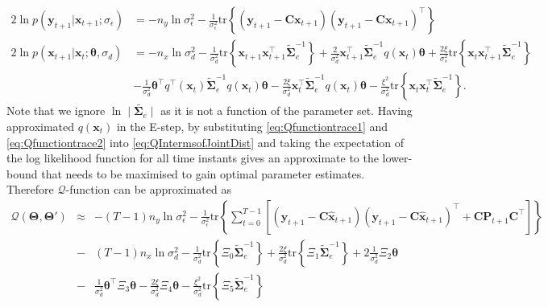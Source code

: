 \documentclass[]{article}
\begin{document}
\begin{align}\label{eq:Qfunctiontrace1}
  2\ln p\left(\mathbf y_{t+1}|\mathbf x_{t+1};\sigma_{\epsilon}\right) &= -n_y\ln \sigma_{\epsilon}^2-\frac{1}{\sigma_{\epsilon}^2}\mathrm{tr}\left\lbrace(\mathbf y_{t+1}-\mathbf C\mathbf  x_{t+1}) (\mathbf y_{t+1}-\mathbf C\mathbf  x_{t+1})^\top\right\rbrace    \\
 2 \ln p(\mathbf x_{t+1}|\mathbf x_{t};\boldsymbol \theta ,\sigma_d) &=-n_x\ln\sigma_d^2-\frac{1}{\sigma_d^2}\mathrm{tr}\left\lbrace\mathbf x_{t+1} \mathbf x_{t+1}^\top\tilde{\boldsymbol\Sigma}_e^{-1}\right\rbrace+\frac{2}{\sigma_d^2}\mathbf x_{t+1}^\top\tilde{\boldsymbol\Sigma}_e^{-1}q( \mathbf x_t)\boldsymbol\theta+\frac{2\xi}{\sigma_s^2} \mathrm{tr} \left\lbrace \mathbf x_t\mathbf x_{t+1}^\top\tilde{\boldsymbol\Sigma}_e^{-1}\right\rbrace \nonumber \\
&-\frac{1}{\sigma_d^2}\boldsymbol\theta^\top q^\top(\mathbf x_t)\tilde{\boldsymbol\Sigma}_e^{-1}q(\mathbf x_t)\boldsymbol\theta-\frac{2\xi}{\sigma_d^2} \mathbf x_t^\top\tilde{\boldsymbol\Sigma}_e^{-1}q(\mathbf x_t)\boldsymbol\theta-\frac{\xi^2}{\sigma_d^2}\mathrm{tr}\left\lbrace \mathbf x_t \mathbf x_t^\top\tilde{\boldsymbol\Sigma}_e^{-1}\right\rbrace. \label{eq:Qfunctiontrace2}
\end{align}
Note that we ignore $\ln\mid\tilde{\boldsymbol\Sigma_e}\mid $ as it is not a function of the parameter set. Having approximated $q\left(\mathbf x_t\right)$ in the E-step, by substituting  \ref{eq:Qfunctiontrace1} and \ref{eq:Qfunctiontrace2} into \ref{eq:QIntermsofJointDist} and taking the expectation of the log likelihood function for all time instants gives an approximate to the lower-bound that needs to be maximised to gain optimal parameter estimates. Therefore $\mathcal Q$-function can be approximated as  
\begin{eqnarray}\label{eq:Voldermont}
 \mathcal Q(\boldsymbol \Theta,\boldsymbol\Theta')&\approx& -(T-1)n_y\ln \sigma_{\epsilon}^2-\frac{1}{\sigma_{\epsilon}^2}\mathrm{tr}\left\lbrace\boldsymbol\sum_{t=0}^{T-1}\left[ (\mathbf y_{t+1}-\mathbf C\mathbf{\hat{x}}_{t+1}) (\mathbf y_{t+1}-\mathbf C\mathbf{\hat{x}}_{t+1})^\top+\mathbf C \mathbf P_{t+1}\mathbf C^\top\right] \right\rbrace\nonumber \\
&-&(T-1)n_x\ln\sigma_d^2-\frac{1}{\sigma_d^2}\mathrm{tr}\left\lbrace \Xi_{0} \tilde{\boldsymbol\Sigma}_e^{-1}\right\rbrace +\frac{2\xi}{\sigma_d^2} \mathrm{tr}\left\lbrace \Xi_{1} \tilde{\boldsymbol\Sigma}_e^{-1}\right\rbrace+2\frac{1}{\sigma_d^2}\Xi_{2}\boldsymbol\theta
 \nonumber \\
&-&\frac{1}{\sigma_d^2}\boldsymbol\theta^\top \Xi_{3}\boldsymbol\theta-\frac{2\xi}{\sigma_d^2} \Xi_{4} \boldsymbol\theta -  \frac{\xi^2}{\sigma_d^2}\mathrm{tr} \left\lbrace\Xi_{5}\tilde{\boldsymbol\Sigma}_e^{-1} \right\rbrace 
\end{eqnarray}
\end{document}
